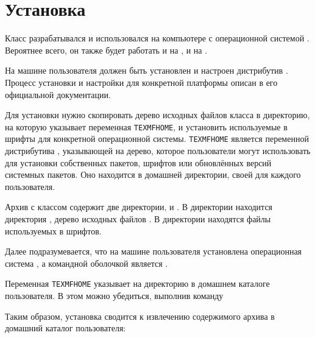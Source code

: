 
\section{Установка}

Класс  разрабатывался и использовался на компьютере с операционной
системой . Вероятнее всего, он также будет работать и на
, и на .

На машине пользователя  должен быть установлен и настроен
дистрибутив . Процесс установки и настройки 
для конкретной платформы описан в его официальной документации.

Для установки  нужно скопировать дерево исходных файлов класса в
директорию, на которую указывает переменная \texttt{TEXMFHOME}, и установить
используемые в  шрифты для конкретной операционной системы.
\texttt{TEXMFHOME} является переменной дистрибутива ,
указывающей на дерево, которое пользователи  могут использовать
для установки собственных пакетов, шрифтов или обновлённых версий системных
пакетов. Оно находится в домашней директории, своей для каждого пользователя.

Архив с классом  содержит две директории,  и
. В директории  находится директория , дерево
исходных файлов . В директории  находятся файлы
используемых в  шрифтов.

Далее подразумевается, что на машине пользователя установлена операционная
система , а командной оболочкой является .

Переменная \texttt{TEXMFHOME} указывает на директорию  в домашнем
каталоге пользователя. В этом можно убедиться, выполнив команду


Таким образом, установка  сводится к извлечению содержимого архива
в домашний каталог пользователя:


